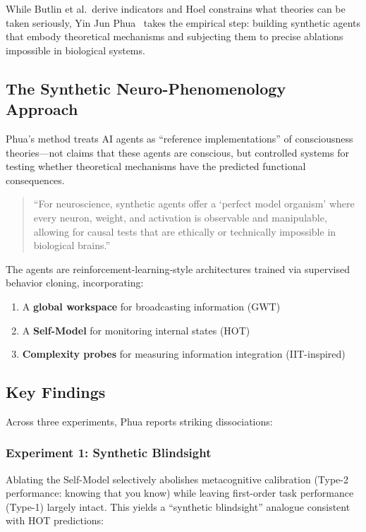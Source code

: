 While Butlin et al.\ derive indicators and Hoel constrains what theories can be taken seriously, Yin Jun Phua~\citep{phua2025} takes the empirical step: building synthetic agents that embody theoretical mechanisms and subjecting them to precise ablations impossible in biological systems.

\subsection{The Synthetic Neuro-Phenomenology Approach}

Phua's method treats AI agents as ``reference implementations'' of consciousness theories---not claims that these agents are conscious, but controlled systems for testing whether theoretical mechanisms have the predicted functional consequences.

\begin{quote}
``For neuroscience, synthetic agents offer a `perfect model organism' where every neuron, weight, and activation is observable and manipulable, allowing for causal tests that are ethically or technically impossible in biological brains.''~\citep[p.~1]{phua2025}
\end{quote}

The agents are reinforcement-learning-style architectures trained via supervised behavior cloning, incorporating:
\begin{enumerate}
    \item A \textbf{global workspace} for broadcasting information (GWT)
    \item A \textbf{Self-Model} for monitoring internal states (HOT)
    \item \textbf{Complexity probes} for measuring information integration (IIT-inspired)
\end{enumerate}

\subsection{Key Findings}

Across three experiments, Phua reports striking dissociations:

\subsubsection{Experiment 1: Synthetic Blindsight}

Ablating the Self-Model selectively abolishes metacognitive calibration (Type-2 performance: knowing that you know) while leaving first-order task performance (Type-1) largely intact. This yields a ``synthetic blindsight'' analogue consistent with HOT predictions:

